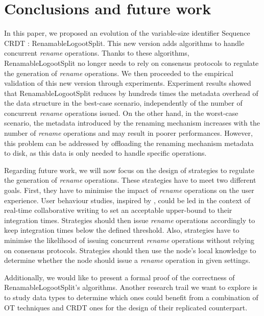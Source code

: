 \documentclass[sigplan,10pt]{acmart}
\begin{document}
\section{Conclusions and future work}

In this paper, we proposed an evolution of the variable-size identifier Sequence \ac{CRDT} : RenamableLogootSplit.
This new version adds algorithms to handle concurrent \emph{rename} operations.
Thanks to these algorithms, RenamableLogootSplit no longer needs to rely on consensus protocols to regulate the generation of \emph{rename} operations.
We then proceeded to the empirical validation of this new version through experiments.
Experiment results showed that RenamableLogootSplit reduces by hundreds times the metadata overhead of the data structure in the best-case scenario, independently of the number of concurrent \emph{rename} operations issued.
On the other hand, in the worst-case scenario, the metadata introduced by the renaming mechanism increases with the number of \emph{rename} operations and may result in poorer performances.
However, this problem can be addressed by offloading the renaming mechanism metadata to disk, as this data is only needed to handle specific operations.

Regarding future work, we will now focus on the design of strategies to regulate the generation of \emph{rename} operations.
These strategies have to meet two different goals.
First, they have to minimise the impact of \emph{rename} operations on the user experience.
User behaviour studies, inspired by \cite{ignat:hal-01088815,ignat:hal-01238831}, could be led in the context of real-time collaborative writing to set an acceptable upper-bound to their integration times.
Strategies should then issue \emph{rename} operations accordingly to keep integration times below the defined threshold.
Also, strategies have to minimise the likelihood of issuing concurrent \emph{rename} operations without relying on consensus protocols.
Strategies should then use the node's local knowledge to determine whether the node should issue a \emph{rename} operation in given settings.

Additionally, we would like to present a formal proof of the correctness of RenamableLogootSplit's algorithms.
Another research trail we want to explore is to study data types to determine which ones could benefit from a combination of \ac{OT} techniques and \ac{CRDT} ones for the design of their replicated counterpart.

\appendix
\end{document}
